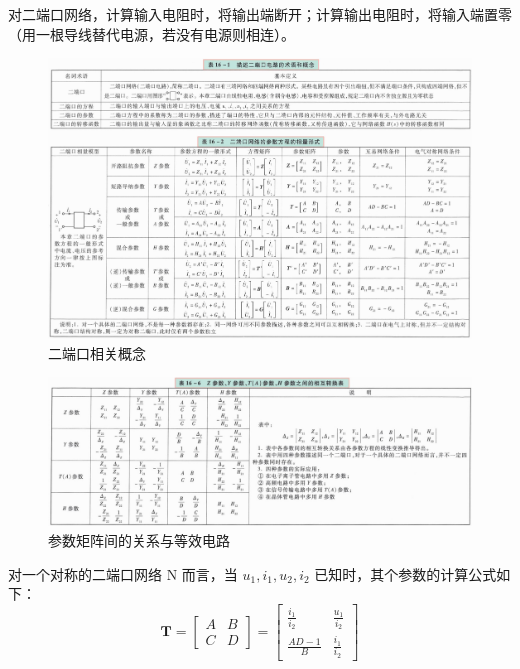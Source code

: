 \documentclass[UTF8]{report}
\theoremstyle{MyLineTheoremStyle} %
\theoremstyle{MyBlockTheoremStyle} %
\theoremstyle{MySubsubsectionStyle} %
\begin{document}
对二端口网络，计算输入电阻时，将输出端断开；计算输出电阻时，将输入端置零（用一根导线替代电源，若没有电源则相连）。

\newpage
\begin{figure}[H]\centering
\includegraphics[width=\textwidth]{assets/1,2/二端口网络.jpg}
\caption{ 二端口相关概念}\label{二端口相关概念}
\end{figure}

\begin{figure}[H]\centering
\includegraphics[width=\textwidth]{assets/1,2/image (9).jpg}
\caption{ 参数矩阵间的关系与等效电路}\label{参数矩阵间的关系与等效电路}
\end{figure}

对一个对称的二端口网络 N 而言，当 $u_1, i_1, u_2, i_2$ 已知时，其个参数的计算公式如下：
\begin{equation}
\boldsymbol{T} = 
\begin{bmatrix}
    A & B \\ 
    C & D
\end{bmatrix}
=
\begin{bmatrix}
    \frac{i_1}{i_2} & \frac{u_1}{i_2} \\ 
    \frac{AD - 1}{B} & \frac{i_1}{i_2}
\end{bmatrix}
\end{equation}
\end{document}
